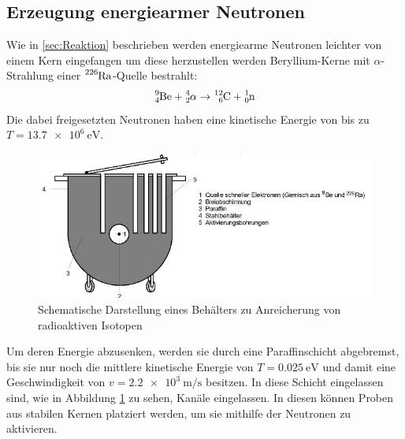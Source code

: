 \subsection{Erzeugung energiearmer Neutronen}

Wie in \ref{sec:Reaktion} beschrieben werden energiearme Neutronen leichter von einem Kern eingefangen um diese herzustellen werden Beryllium-Kerne mit $\alpha$-Strahlung einer $\ce{^{226}_{}Ra}$-Quelle bestrahlt:
\begin{equation}
\ce{^{9}_{4}Be} + \ce{^{4}_{2}\alpha}\rightarrow \ce{^{12}_{6}C}+\ce{^{1}_{0}n}
\end{equation}
Die dabei freigesetzten Neutronen haben eine kinetische Energie von bis zu $T=\SI{13,7e6}{\electronvolt}$.
\begin{figure}
\centering
\includegraphics[scale=0.5]{content/images/neutronen.jpg}
\caption{Schematische Darstellung eines Behälters zu Anreicherung von radioaktiven Isotopen\cite{V702}}
\label{fig:ne}
\end{figure}
\noindent Um deren Energie abzusenken, werden sie durch eine Paraffinschicht abgebremst, bis sie nur noch die mittlere kinetische Energie von 
$T=\SI{0,025}{\electronvolt}$ und damit eine Geschwindigkeit von $v=\SI{2,2e3}{\metre\per\second}$ besitzen.
In diese Schicht eingelassen sind, wie in Abbildung \ref{fig:ne} zu sehen, Kanäle
eingelassen. In diesen können Proben aus stabilen Kernen platziert werden, um sie mithilfe der Neutronen zu aktivieren.

